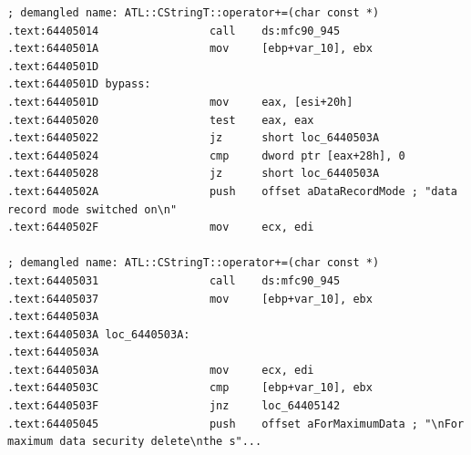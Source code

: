 \begin{lstlisting}
; demangled name: ATL::CStringT::operator+=(char const *)
.text:64405014                 call    ds:mfc90_945
.text:6440501A                 mov     [ebp+var_10], ebx
.text:6440501D
.text:6440501D bypass:
.text:6440501D                 mov     eax, [esi+20h]
.text:64405020                 test    eax, eax
.text:64405022                 jz      short loc_6440503A
.text:64405024                 cmp     dword ptr [eax+28h], 0
.text:64405028                 jz      short loc_6440503A
.text:6440502A                 push    offset aDataRecordMode ; "data record mode switched on\n"
.text:6440502F                 mov     ecx, edi

; demangled name: ATL::CStringT::operator+=(char const *)
.text:64405031                 call    ds:mfc90_945
.text:64405037                 mov     [ebp+var_10], ebx
.text:6440503A
.text:6440503A loc_6440503A:
.text:6440503A
.text:6440503A                 mov     ecx, edi
.text:6440503C                 cmp     [ebp+var_10], ebx
.text:6440503F                 jnz     loc_64405142
.text:64405045                 push    offset aForMaximumData ; "\nFor maximum data security delete\nthe s"...


\end{lstlisting}
